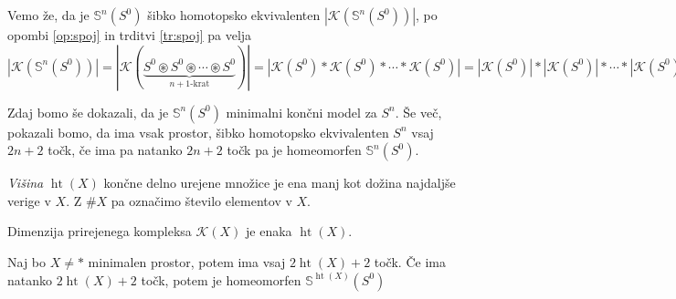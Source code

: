 \documentclass[mat1]{fmfdelo}
\DeclareRobustCommand{\k}{
    \mathcal{K}
}
\DeclareMathOperator*{\htt}{ht}
\begin{document}
\begin{dokaz}
    Vemo že, da je $\mathds{S}^n(S^0)$ šibko homotopsko ekvivalenten $|\k(\mathds{S}^n(S^0))|$,
    po opombi \ref{op:spoj} in trditvi \ref{tr:spoj} pa velja $|\k(\mathds{S}^n(S^0))|=|\k(\underbrace{S^0\circledast S^0 \circledast \cdots \circledast S^0}_\text{$n+1$-krat})|=
    |\k(S^0)\ast\k(S^0) \ast \cdots \ast \k(S^0)|=|\k(S^0)|\ast
    |\k(S^0)| \ast \cdots \ast |\k(S^0)|=S^0\ast
    S^0 \ast \cdots \ast S^0=S^n$
\end{dokaz}

Zdaj bomo še dokazali, da je $\mathds{S}^n(S^0)$ minimalni končni model za $S^n$. Še več, pokazali bomo, da ima vsak prostor, šibko homotopsko ekvivalenten $S^n$ vsaj $2n+2$ točk, če ima pa natanko $2n+2$ točk pa je homeomorfen $\mathds{S}^n(S^0)$.

\begin{definicija}
    \textit{Višina} $\htt(X)$ končne delno urejene množice je ena manj kot dožina najdaljše verige v $X$. Z $\# X$ pa označimo število elementov v $X$.
\end{definicija}
Dimenzija prirejenega kompleksa $\k(X)$ je enaka $\htt(X)$.


\begin{izrek}
    Naj bo $X\neq\ast$ minimalen prostor, potem ima vsaj $2\htt(X)+2$ točk. Če ima natanko $2\htt(X)+2$ točk, potem je homeomorfen $\mathds{S}^{\htt(X)}(S^0)$
\end{izrek}    
\end{document}
